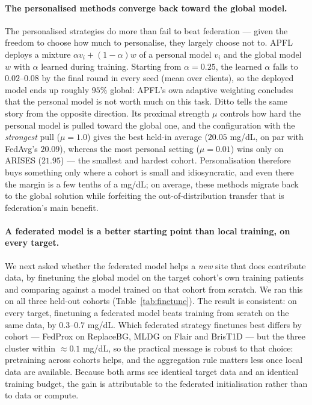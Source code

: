 \documentclass[10pt,letterpaper]{article}
\begin{document}
\paragraph{The personalised methods converge back toward the global model.} The
personalised strategies do more than fail to beat federation --- given the freedom
to choose how much to personalise, they largely choose not to. APFL deploys a
mixture $\alpha v_i + (1-\alpha) w$ of a personal model $v_i$ and the global model
$w$ with $\alpha$ learned during training. Starting from $\alpha = 0.25$, the
learned $\alpha$ falls to $0.02$--$0.08$ by the final round in every seed
(mean over clients), so the deployed model ends up roughly $95\%$ global: APFL's
own adaptive weighting concludes that the personal model is not worth much on this
task. Ditto tells the same story from the opposite direction. Its proximal
strength $\mu$ controls how hard the personal model is pulled toward the global
one, and the configuration with the \emph{strongest} pull ($\mu = 1.0$) gives the
best held-in average ($20.05$ mg/dL, on par with FedAvg's $20.09$), whereas the
most personal
setting ($\mu = 0.01$) wins only on ARISES ($21.95$) --- the smallest and hardest
cohort. Personalisation therefore buys something only where a cohort is small and
idiosyncratic, and even there the margin is a few tenths of a mg/dL; on average,
these methods migrate back to the global solution while forfeiting the
out-of-distribution transfer that is federation's main benefit.

\paragraph{A federated model is a better starting point than local training, on
every target.} We next asked whether the federated model helps a \emph{new} site
that does contribute data, by finetuning the global model on the target cohort's
own training patients and comparing against a model trained on that cohort from
scratch. We ran this on all three held-out cohorts (Table~\ref{tab:finetune}). The
result is consistent: on every target, finetuning a federated model beats training
from scratch on the same data, by $0.3$--$0.7$ mg/dL. Which federated strategy
finetunes best differs by cohort
--- FedProx on ReplaceBG, MLDG on Flair and
BrisT1D --- but the three cluster within $\approx 0.1$ mg/dL, so the practical
message is robust to that choice: pretraining across cohorts helps, and the
aggregation rule matters less once local data are available. Because both arms see
identical target data and an identical training budget, the gain is attributable
to the federated initialisation rather than to data or compute.
\end{document}
